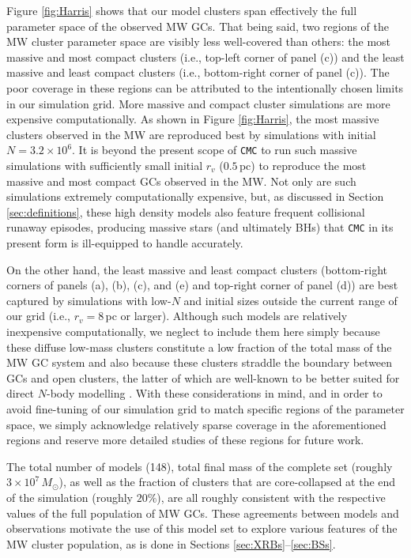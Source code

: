\documentclass[twocolumn,tighten]{aastex63}
\begin{document}
Figure \ref{fig:Harris} shows that our model clusters span effectively the full parameter space of the observed MW GCs. That being said, two regions of the MW cluster parameter space are visibly less well-covered than others: the most massive and most compact clusters (i.e., top-left corner of panel (c)) and the least massive and least compact clusters (i.e., bottom-right corner of panel (c)). The poor coverage in these regions can be attributed to the intentionally chosen limits in our simulation grid. More massive and compact cluster simulations are more expensive computationally. As shown in Figure \ref{fig:Harris}, the most massive clusters observed in the MW are reproduced best by simulations with initial $N=3.2\times10^6$. It is beyond the present scope of \texttt{CMC} to run such massive simulations with sufficiently small initial $r_v$ ($0.5\,$pc) to reproduce the most massive and most compact GCs observed in the MW. Not only are such simulations extremely computationally expensive, but, as discussed in Section \ref{sec:definitions}, these high density models also feature frequent collisional runaway episodes, producing massive stars (and ultimately BHs) that \texttt{CMC} in its present form is ill-equipped to handle accurately.

On the other hand, the least massive and least compact clusters (bottom-right corners of panels (a), (b), (c), and (e) and top-right corner of panel (d)) are best captured by simulations with low-$N$ and initial sizes outside the current range of our grid (i.e., $r_v=8\,$pc or larger). Although such models are relatively inexpensive computationally, we neglect to include them here simply because these diffuse low-mass clusters constitute a low fraction of the total mass of the MW GC system and also because these clusters straddle the boundary between GCs and open clusters, the latter of which are well-known to be better suited for direct $N$-body modelling \citep[e.g.,][for a review]{Aarseth2003}. With these considerations in mind, and in order to avoid fine-tuning of our simulation grid to match specific regions of the parameter space, we simply acknowledge relatively sparse coverage in the aforementioned regions and reserve more detailed studies of these regions for future work.

The total number of models (148), total final mass of the complete set (roughly $3\times 10^7\,M_{\odot}$), as well as the fraction of clusters that are core-collapsed at the end of the simulation (roughly $20\%$), are all roughly consistent with the respective values of the full population of MW GCs. These agreements between models and observations motivate the use of this model set to explore various features of the MW cluster population, as is done in Sections \ref{sec:XRBs}--\ref{sec:BSs}.
\end{document}
